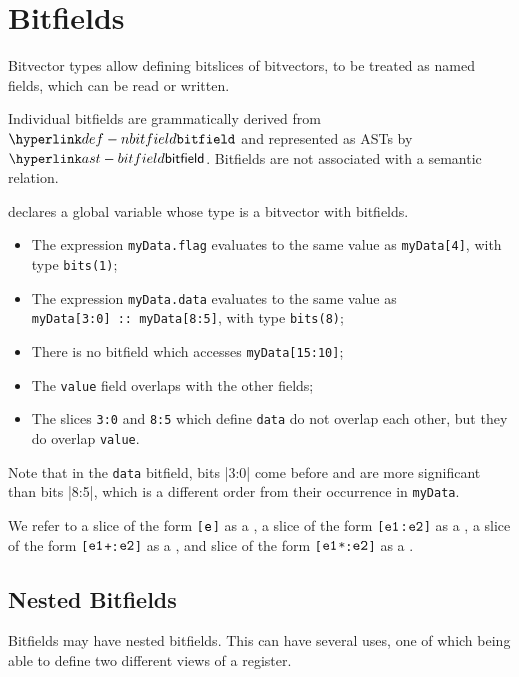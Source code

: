 \chapter{Bitfields\label{chap:Bitfields}}

Bitvector types allow defining bitslices of bitvectors, to be treated as named
fields, which can be read or written. 

\hypertarget{bitfieldterm}{}
Individual bitfields are grammatically derived from $\Nbitfield$ and represented as ASTs by $\bitfield$.
Bitfields are not associated with a semantic relation.

 declares a global variable whose type is a bitvector with bitfields.
\begin{itemize}
  \item The expression \texttt{myData.flag} evaluates to the same value as \verb|myData[4]|, with type \verb|bits(1)|;
  \item The expression \texttt{myData.data} evaluates to the same value as \\
        \verb|myData[3:0] :: myData[8:5]|, with type \verb|bits(8)|;
  \item There is no bitfield which accesses \verb|myData[15:10]|;
  \item The \verb|value| field overlaps with the other fields;
  \item The slices \verb|3:0| and \verb|8:5| which define \texttt{data} do not overlap each other,
        but they do overlap \verb|value|.
\end{itemize}
Note that in the \texttt{data} bitfield, bits |3:0| come before and are more significant than
bits |8:5|, which is a different order from their occurrence in \texttt{myData}.

\hypertarget{def-singleslice}{}
\hypertarget{def-rangeslice}{}
\hypertarget{def-lengthslice}{}
\hypertarget{def-scaledslice}{}
We refer to a slice of the form \texttt{[$\texttt{e}$]} as a \singleslice,
a slice of the form \texttt{[$\texttt{e1}$:$\texttt{e2}$]} as a \rangeslice,
a slice of the form \texttt{[$\texttt{e1}$+:$\texttt{e2}$]} as a \lengthslice,
and slice of the form \texttt{[$\texttt{e1}$*:$\texttt{e2}$]} as a \scaledslice.

\section{Nested Bitfields}
Bitfields may have nested bitfields. This can have several uses, one of which being able to define two
different views of a register.

